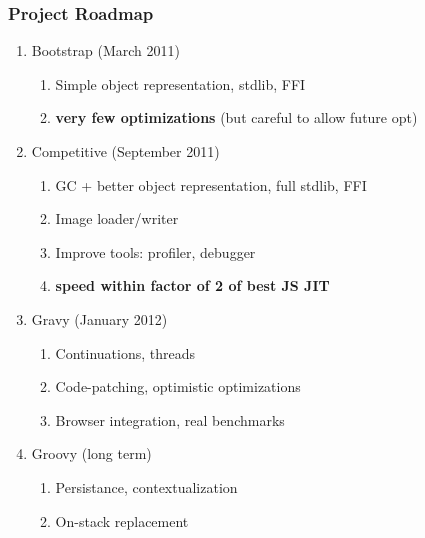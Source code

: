 \begin{frame}
\frametitle{\bf Project Roadmap}
    \begin{enumerate}[1.]

        \item Bootstrap (March 2011)
        \begin{enumerate}[1.]
            \item Simple object representation, stdlib, FFI
            \item {\bf very few optimizations} (but careful to allow future opt)
        \end{enumerate}

        \item Competitive (September 2011)
        \begin{enumerate}[1.]
            \item GC + better object representation, full stdlib, FFI
            \item Image loader/writer
            \item Improve tools: profiler, debugger
            \item {\bf speed within factor of 2 of best JS JIT}
        \end{enumerate}

        \item Gravy (January 2012)
        \begin{enumerate}[1.]
            \item Continuations, threads
            \item Code-patching, optimistic optimizations
            \item Browser integration, real benchmarks
        \end{enumerate}

        \item Groovy (long term)
        \begin{enumerate}[1.]
            \item Persistance, contextualization
            \item On-stack replacement
        \end{enumerate}
    \end{enumerate}
\end{frame}
